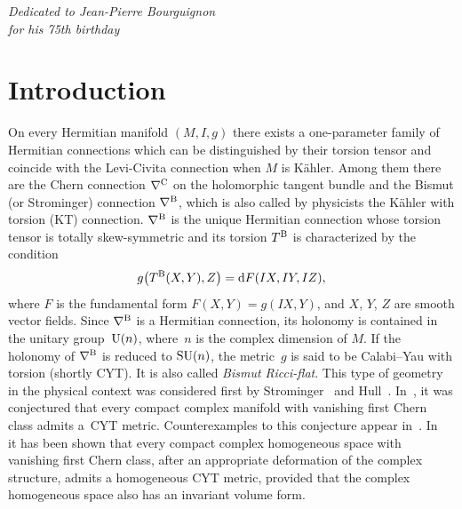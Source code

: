\documentclass[pdftex]{sigma}
\numberwithin{equation}{section}
\begin{document}



\begin{flushright}
\begin{minipage}{65mm}
\it Dedicated to Jean-Pierre Bourguignon\\ for his 75th birthday
\end{minipage}
\end{flushright}

\renewcommand{\thefootnote}{\arabic{footnote}}
\setcounter{footnote}{0}

\section{Introduction}

On every Hermitian manifold $(M, I, g)$ there exists a one-parameter family of Hermitian connections which can be distinguished by their torsion tensor and coincide with the Levi-Civita connection when $M$ is K\"ahler. Among them there are
the Chern connection $\nabla^{\rm C}$ on the holomorphic tangent bundle and the Bismut (or Strominger) connection $\nabla^{\rm B}$, which is also called by physicists the K\"ahler with torsion (KT) connection. $\nabla^{\rm B}$ is the unique Hermitian connection whose torsion tensor is totally skew-symmetric and its torsion $T^{\rm B}$ is characterized by the condition
\[
g \big(T^{\rm B}(X,Y), Z\big) = {\rm d}F(IX,IY,IZ),
\]
where $F$ is the fundamental form $F(X,Y) = g(IX,Y)$, and $X$, $Y$, $Z$ are smooth vector fields. Since $\nabla^{\rm B}$ is a Hermitian connection, its holonomy is contained in the unitary group~${\rm U}(n)$, where~$n$ is the complex dimension of $M$. If the holonomy of $\nabla^{\rm B}$ is reduced to ${\rm SU}(n)$, the metric~$g$
is said to be Calabi--Yau with torsion (shortly CYT). It is also called {\it Bismut Ricci-flat}.
This type of geometry in the physical context was considered first by Strominger~\cite{Strominger} and
Hull~\cite{Hull}. In~\cite{GIP}, it was conjectured that every compact complex manifold with vanishing first Chern class admits a~CYT metric. Counterexamples to this conjecture appear in~\cite{FG}. In~\cite{Grantcharov} it has been shown that every compact complex homogeneous space with vanishing first Chern class, after an appropriate deformation of the complex structure, admits a homogeneous CYT metric, provided that the complex homogeneous space also has an invariant volume form.
\end{document}
